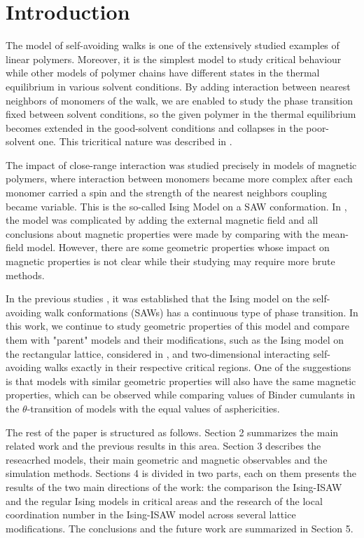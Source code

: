 \section{Introduction}

The model of self-avoiding walks is one of the extensively studied examples of linear polymers. 
Moreover, it is the simplest model to study critical behaviour while other models of polymer chains have different states in the thermal equilibrium in various solvent conditions. 
By adding interaction between nearest neighbors of monomers of the walk, we are enabled to study the phase transition fixed between solvent conditions, so the given polymer in the thermal equilibrium becomes extended in the good-solvent conditions and collapses in the poor-solvent one. 
This tricritical nature was described in \cite{Gennes1979}.

The impact of close-range interaction was studied precisely in models of magnetic polymers, where interaction between monomers became more complex after each monomer carried a spin and the strength of the nearest neighbors coupling became variable. 
This is the so-called Ising Model on a SAW conformation. 
In \cite{Garel1999}, the model was complicated by adding the external magnetic field and all conclusions about magnetic properties were made by comparing with the mean-field model. 
However, there are some geometric properties whose impact on magnetic properties is not clear while their studying may require more brute methods.

In the previous studies \cite{faizullina2021critical}, it was established that the Ising model on the self-avoiding walk conformations (SAWs) has a continuous type of phase transition. 
In this work, we continue to study geometric properties of this model and compare them with "parent" models and their modifications, such as the Ising model on the rectangular lattice, considered in \cite{Selke2006}, and two-dimensional interacting self-avoiding walks exactly in their respective critical regions. 
One of the suggestions is that models with similar geometric properties will also have the same magnetic properties, which can be observed while comparing values of Binder cumulants in the $\theta$-transition of models with the equal values of asphericities.

The rest of the paper is structured as follows. 
Section 2 summarizes the main related work and the previous results in this area. 
Section 3 describes the reseacrhed models, their main geometric and magnetic observables and the simulation methods. 
Sections 4 is divided in two parts, each on them presents the results of the two main directions of the work: the comparison the Ising-ISAW and the regular Ising models in critical areas and the research of the local coordination number in the Ising-ISAW model across several lattice modifications.
The conclusions and the future work are summarized in Section 5.
